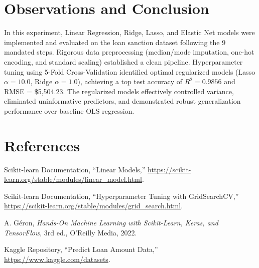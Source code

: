 \documentclass[12pt,a4paper]{article}
\begin{document}
\section{Observations and Conclusion}
In this experiment, Linear Regression, Ridge, Lasso, and Elastic Net models were implemented and evaluated on the loan sanction dataset following the 9 mandated steps. Rigorous data preprocessing (median/mode imputation, one-hot encoding, and standard scaling) established a clean pipeline. Hyperparameter tuning using 5-Fold Cross-Validation identified optimal regularized models (Lasso $\alpha=10.0$, Ridge $\alpha=1.0$), achieving a top test accuracy of $R^2 = 0.9856$ and RMSE = \$5,504.23. The regularized models effectively controlled variance, eliminated uninformative predictors, and demonstrated robust generalization performance over baseline OLS regression.

\section{References}
\begin{enumerate}[label={[\arabic*]}, leftmargin=2em]
    \item Scikit-learn Documentation, ``Linear Models,'' \url{https://scikit-learn.org/stable/modules/linear_model.html}.
    \item Scikit-learn Documentation, ``Hyperparameter Tuning with GridSearchCV,'' \url{https://scikit-learn.org/stable/modules/grid_search.html}.
    \item A. Géron, \textit{Hands-On Machine Learning with Scikit-Learn, Keras, and TensorFlow}, 3rd ed., O'Reilly Media, 2022.
    \item Kaggle Repository, ``Predict Loan Amount Data,'' \url{https://www.kaggle.com/datasets}.
\end{enumerate}
\end{document}
